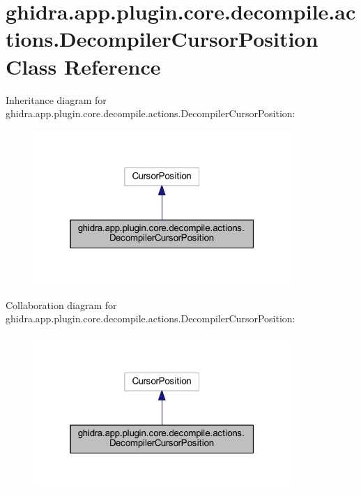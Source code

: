 \hypertarget{classghidra_1_1app_1_1plugin_1_1core_1_1decompile_1_1actions_1_1_decompiler_cursor_position}{}\section{ghidra.\+app.\+plugin.\+core.\+decompile.\+actions.\+Decompiler\+Cursor\+Position Class Reference}
\label{classghidra_1_1app_1_1plugin_1_1core_1_1decompile_1_1actions_1_1_decompiler_cursor_position}


Inheritance diagram for ghidra.\+app.\+plugin.\+core.\+decompile.\+actions.\+Decompiler\+Cursor\+Position\+:
\nopagebreak
\begin{figure}[H]
\begin{center}
\leavevmode
\includegraphics[width=277pt]{classghidra_1_1app_1_1plugin_1_1core_1_1decompile_1_1actions_1_1_decompiler_cursor_position__inherit__graph}
\end{center}
\end{figure}


Collaboration diagram for ghidra.\+app.\+plugin.\+core.\+decompile.\+actions.\+Decompiler\+Cursor\+Position\+:
\nopagebreak
\begin{figure}[H]
\begin{center}
\leavevmode
\includegraphics[width=277pt]{classghidra_1_1app_1_1plugin_1_1core_1_1decompile_1_1actions_1_1_decompiler_cursor_position__coll__graph}
\end{center}
\end{figure}
